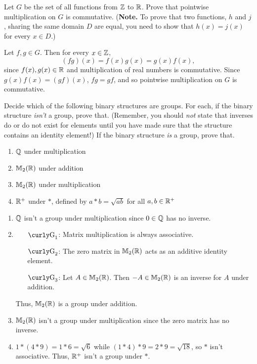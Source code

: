 \begin{exercise}[ID=2F]
Let $G$ be the set of all functions from $\mathbb{Z}$ to $\mathbb{R}$.  Prove that pointwise multiplication on $G$ is commutative. (\textbf{Note.} To prove that two functions, $h$ and $j$, sharing the same domain $D$ are equal, you need to show that $h(x)=j(x)$ for every $x\in D$.)
\end{exercise}

\begin{solution}[print=false]
Let $f,g\in G$.  Then for every $x\in \mathbb{Z}$,
$$(fg)(x)=f(x)g(x)=g(x)f(x),$$
since $f(x), g(x)\in \mathbb{R}$ and multiplication of real numbers is commutative. Since $g(x)f(x)=(gf)(x)$,
$fg=gf$, and so pointwise multiplication on $G$ is commutative.
\end{solution}

\begin{exercise}[ID=2J]
Decide which of the following binary structures are groups.  For each, if the binary structure \textit{isn't} a group, prove that. (Remember, you should \textit{not} state that inverses do or do not exist for elements until you have made sure that the structure contains an identity element!) If the binary structure {\it is} a group, prove that.

\begin{enumerate}
\item $\mathbb{Q}$ under multiplication
\item $\mathbb{M}_2(\mathbb{R})$ under addition
\item $\mathbb{M}_2(\mathbb{R})$ under multiplication
\item $\mathbb{R}^+$ under $*$, defined by $a*b=\sqrt{ab}$ for all $a,b\in \mathbb{R}^+$
\end{enumerate}
\end{exercise}

\begin{solution}[print=false]
\begin{enumerate}
\item $\mathbb{Q}$ isn't a group under multiplication since $0\in \mathbb{Q}$ has no inverse.
\item
\begin{enumerate}
\item[$\G_1$:] Matrix multiplication is always associative.
\item[$\G_2$:] The zero matrix in $\mathbb{M}_2(\mathbb{R})$ acts as an additive identity element.
\item[$\G_3$:] Let $A\in \mathbb{M}_2(\mathbb{R})$.  Then $-A\in \mathbb{M}_2(\mathbb{R})$ is an inverse for $A$ under addition.
\end{enumerate}
Thus, $\mathbb{M}_2(\mathbb{R})$ is a group under addition.

\item $\mathbb{M}_2(\mathbb{R})$ isn't a group under multiplication since the zero matrix has no inverse.
\item $1*(4*9)=1*6=\sqrt{6}$ while $(1*4)*9=2*9=\sqrt{18}$, so $*$ isn't associative.  Thus, $\mathbb{R}^+$ isn't a group under $*$.
\end{enumerate}
\end{solution}


